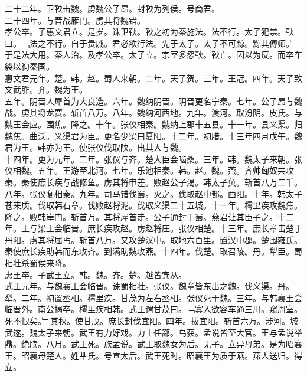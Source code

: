 \documentclass{zhvt-classic}
\begin{document}
\hspace*{2em}二十二年。卫鞅击魏。虏魏公子昂。封鞅为列侯。号商君。\\
\hspace*{2em}二十四年。与晋战雁门。虏其将魏错。\\
\hspace*{2em}孝公卒。子惠文君立。是岁。诛卫鞅。鞅之初为秦施法。法不行。太子犯禁。鞅曰。﹁法之不行。自于贵戚。君必欲行法。先于太子。太子不可黥。黥其傅师。﹂于是法大用。秦人治。及孝公卒。太子立。宗室多怨鞅。鞅亡。因以为反。而卒车裂以徇秦国。\\
\hspace*{2em}惠文君元年。楚。韩。赵。蜀人来朝。二年。天子贺。三年。王冠。四年。天子致文武胙。齐。魏为王。\\
\hspace*{2em}五年。阴晋人犀首为大良造。六年。魏纳阴晋。阴晋更名宁秦。七年。公子昂与魏战。虏其将龙贾。斩首八万。八年。魏纳河西地。九年。渡河。取汾阴。皮氏。与魏王会应。围焦。降之。十年。张仪相秦。魏纳上郡十五县。十一年。县义渠。归魏焦。曲沃。义渠君为臣。更名少梁曰夏阳。十二年。初腊。十三年四月戊午。魏君为王。韩亦为王。使张仪伐取陕。出其人与魏。\\
\hspace*{2em}十四年。更为元年。二年。张仪与齐。楚大臣会啮桑。三年。韩。魏太子来朝。张仪相魏。五年。王游至北河。七年。乐池相秦。韩。赵。魏。燕。齐帅匈奴共攻秦。秦使庶长疾与战修鱼。虏其将申差。败赵公子渴。韩太子奂。斩首八万二千。八年。张仪复相秦。九年。司马错伐蜀。灭之。伐取赵中都。西阳。十年。韩太子苍来质。伐取韩石章。伐败赵将泥。伐取义渠二十五城。十一年。樗里疾攻魏焦。降之。败韩岸门。斩首万。其将犀首走。公子通封于蜀。燕君让其臣子之。十二年。王与梁王会临晋。庶长疾攻赵。虏赵将庄。张仪相楚。十三年。庶长章击楚于丹阳。虏其将屈丐。斩首八万。又攻楚汉中。取地六百里。置汉中郡。楚围雍氏。秦使庶长疾助韩而东攻齐。到满助魏攻燕。十四年。伐楚。取召陵。丹。犁臣。蜀相壮杀蜀侯来降。\\
\hspace*{2em}惠王卒。子武王立。韩。魏。齐。楚。越皆宾从。\\
\hspace*{2em}武王元年。与魏襄王会临晋。诛蜀相壮。张仪。魏章皆东出之魏。伐义渠。丹。犁。二年。初置丞相。樗里疾。甘茂为左右丞相。张仪死于魏。三年。与韩襄王会临晋外。南公揭卒。樗里疾相韩。武王谓甘茂曰。﹁寡人欲容车通三川。窥周室。死不恨矣。﹂其秋。使甘茂。庶长封伐宜阳。四年。拔宜阳。斩首六万。涉河。城武遂。魏太子来朝。武王有力好戏。力士任鄙。乌获。孟说皆至大官。王与孟说举鼎。绝膑。八月。武王死。族孟说。武王取魏女为后。无子。立异母弟。是为昭襄王。昭襄母楚人。姓芈氏。号宣太后。武王死时。昭襄王为质于燕。燕人送归。得立。\\
\end{document}
